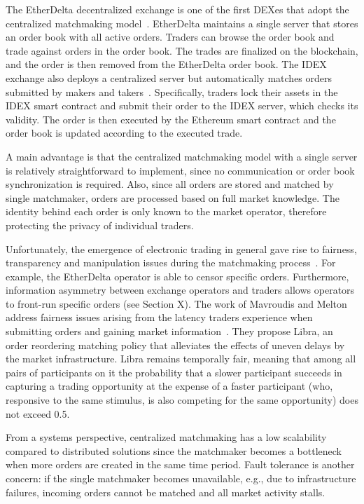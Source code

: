 The EtherDelta decentralized exchange is one of the first DEXes that adopt the centralized matchmaking model~\cite{Anonymous:brZbAflS}.
EtherDelta maintains a single server that stores an order book with all active orders.
Traders can browse the order book and trade against orders in the order book.
The trades are finalized on the blockchain, and the order is then removed from the EtherDelta order book.
The IDEX exchange also deploys a centralized server but automatically matches orders submitted by makers and takers~\cite{AuroraLabs:B4jmyRY8}.
Specifically, traders lock their assets in the IDEX smart contract and submit their order to the IDEX server, which checks its validity.
The order is then executed by the Ethereum smart contract and the order book is updated according to the executed trade.

A main advantage is that the centralized matchmaking model with a single server is relatively straightforward to implement, since no communication or order book synchronization is required.
Also, since all orders are stored and matched by single matchmaker, orders are processed based on full market knowledge.
The identity behind each order is only known to the market operator, therefore protecting the privacy of individual traders.

Unfortunately, the emergence of electronic trading in general gave rise to fairness, transparency and manipulation issues during the matchmaking process~\cite{Mavroudis:2019iw}.
For example, the EtherDelta operator is able to censor specific orders.
Furthermore, information asymmetry between exchange operators and traders allows operators to front-run specific orders (see Section X).
The work of Mavroudis and Melton address fairness issues arising from the latency traders experience when submitting orders and gaining market information~\cite{Mavroudis:2019iw}.
They propose Libra, an order reordering matching policy that alleviates the effects of uneven delays by the market infrastructure.
Libra remains temporally fair, meaning that among all pairs of participants on it the probability that a slower participant succeeds in capturing a trading opportunity at the expense of a faster participant (who, responsive to the same stimulus, is also competing for the same opportunity) does not exceed 0.5.

From a systems perspective, centralized matchmaking has a low scalability compared to distributed solutions since the matchmaker becomes a bottleneck when more orders are created in the same time period.
Fault tolerance is another concern: if the single matchmaker becomes unavailable, e.g., due to infrastructure failures, incoming orders cannot be matched and all market activity stalls.

